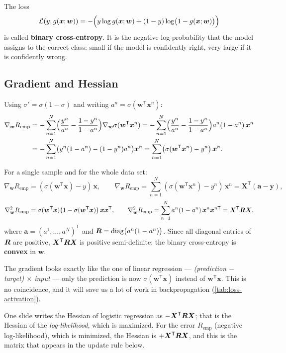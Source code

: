 \documentclass[11pt, oneside]{book}
\newcommand{\grad}{\nabla}               %
\newcommand{\hess}{\nabla^2}             %
\newcommand{\T}{^{\mathsf{T}}}           %
\newcommand{\diag}{\operatorname{diag}}
\newcommand{\loss}{\mathcal{L}}          %
\newcommand{\params}{\boldsymbol{\theta}}   %
\newcommand{\bx}{\bm{x}}        \newcommand{\by}{\bm{y}}
\newcommand{\bw}{\bm{w}}        \newcommand{\bW}{\bm{W}}
\newcommand{\ba}{\bm{a}}        \newcommand{\bs}{\bm{s}}
\newcommand{\bX}{\bm{X}}        \newcommand{\bY}{\bm{Y}}
\newcommand{\Remp}{R_{\mathrm{emp}}}     %
\let\originalsubsection\subsection
\renewcommand{\subsection}{\Needspace{6\baselineskip}\originalsubsection}
\begin{document}
\begin{defbox}[title={Binary cross-entropy}]
The loss
\[
  \loss(y, g(\bx;\bw)) = -\Bigl(y \log g(\bx;\bw) + (1-y)\log\bigl(1 - g(\bx;\bw)\bigr)\Bigr)
\]
is called \textbf{binary cross-entropy}. It is the negative log-probability
that the model assigns to the correct class: small if the model is
confidently right, very large if it is confidently wrong.
\end{defbox}

\subsection{Gradient and Hessian}

Using $\sigma' = \sigma(1-\sigma)$ and writing $a^n = \sigma(\bw\T\bx^n)$:
\begin{align*}
  \grad_{\bw}\Remp
  &= -\sum_{n=1}^{N} \Bigl( \frac{y^n}{a^n} - \frac{1 - y^n}{1 - a^n} \Bigr)
     \grad_{\bw}\sigma(\bw\T\bx^n)
   = -\sum_{n=1}^{N} \Bigl( \frac{y^n}{a^n} - \frac{1 - y^n}{1 - a^n} \Bigr)
     a^n(1 - a^n)\,\bx^n \\
  &= -\sum_{n=1}^{N} \bigl( y^n(1 - a^n) - (1 - y^n)a^n \bigr)\bx^n
   = \sum_{n=1}^{N} \bigl(\sigma(\bw\T\bx^n) - y^n\bigr)\,\bx^n .
\end{align*}

\begin{thmbox}[title={Logistic regression: gradient and Hessian}]
For a single sample and for the whole data set:
\[
  \grad_{\bw}\Remp = (\sigma(\bw\T\bx) - y)\,\bx,
  \qquad
  \grad_{\bw}\Remp = \sum_{n=1}^{N}(\sigma(\bw\T\bx^n) - y^n)\,\bx^n = \bX\T(\ba - \by),
\]
\[
  \hess_{\bw}\Remp = \sigma(\bw\T\bx)\bigl(1 - \sigma(\bw\T\bx)\bigr)\,\bx\bx\T,
  \qquad
  \hess_{\bw}\Remp = \sum_{n=1}^{N} a^n(1 - a^n)\,\bx^n\bx^{n\mathsf{T}} = \bX\T\bR\bX,
\]
where $\ba = (a^1, \dots, a^N)\T$ and $\bR = \diag\bigl(a^n(1 - a^n)\bigr)$.
Since all diagonal entries of $\bm{R}$ are positive, $\bX\T\bR\bX$ is positive
semi-definite: the binary cross-entropy is \textbf{convex} in $\bw$.
\end{thmbox}

The gradient looks exactly like the one of linear regression ---
\emph{(prediction $-$ target) $\times$ input} --- only the prediction is now
$\sigma(\bw\T\bx)$ instead of $\bw\T\bx$. This is no coincidence, and it will
save us a lot of work in backpropagation (\cref{tab:loss-activation}).

\begin{notebox}[title={The sign of the Hessian}]
One slide writes the Hessian of logistic regression as $-\bX\T\bR\bX$; that
is the Hessian of the \emph{log-likelihood}, which is maximized. For the
error $\Remp$ (negative log-likelihood), which is minimized, the Hessian is
$+\bX\T\bR\bX$, and this is the matrix that appears in the update rule
below.
\end{notebox}
\end{document}
